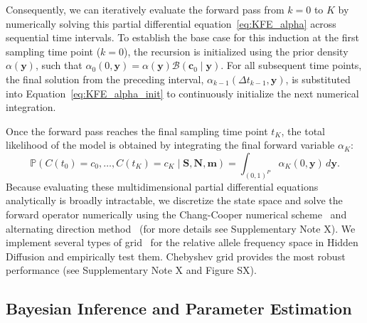 \documentclass{article}
\begin{document}
Consequently, we can iteratively evaluate the forward pass from $k = 0$ to $K$ by numerically solving this partial differential equation~\ref{eq:KFE_alpha} across sequential time intervals.
To establish the base case for this induction at the first sampling time point ($k = 0$), the recursion is initialized using the prior density $\alpha(\mathbf{y})$, such that $ \alpha_0(0, \mathbf{y}) = \alpha(\mathbf{y}) \mathcal{B}(\mathbf{c}_0 \mid \mathbf{y}) $.
For all subsequent time points, the final solution from the preceding interval, $ \alpha_{k-1}(\Delta t_{k-1}, \mathbf{y}) $, is substituted into Equation~\ref{eq:KFE_alpha_init} to continuously initialize the next numerical integration.

Once the forward pass reaches the final sampling time point $t_K$, the total likelihood of the model is obtained by integrating the final forward variable $\alpha_K$:
\begin{equation}\label{eq:spatial_emission}
\mathbb{P}(C(t_0)=c_0, \dots, C(t_K) = c_K \mid \mathbf{S}, \mathbf{N}, \mathbf{m}) = \int_{(0, 1)^P} \alpha_K(0, \mathbf{y})\, d\mathbf{y}.
\end{equation}
Because evaluating these multidimensional partial differential equations analytically is broadly intractable, we discretize the state space and solve the forward operator numerically using the Chang-Cooper numerical scheme~\cite{chang1970,pareschi2018} and alternating direction method~\cite{press2007} (for more details see Supplementary Note X).
We implement several types of grid~\citep{gutenkunst2009,cheng2025, malaspinas2012} for the relative allele frequency space in Hidden Diffusion and empirically test them.
Chebyshev grid provides the most robust performance (see Supplementary Note X and Figure SX).

\subsection{Bayesian Inference and Parameter Estimation}
\end{document}
